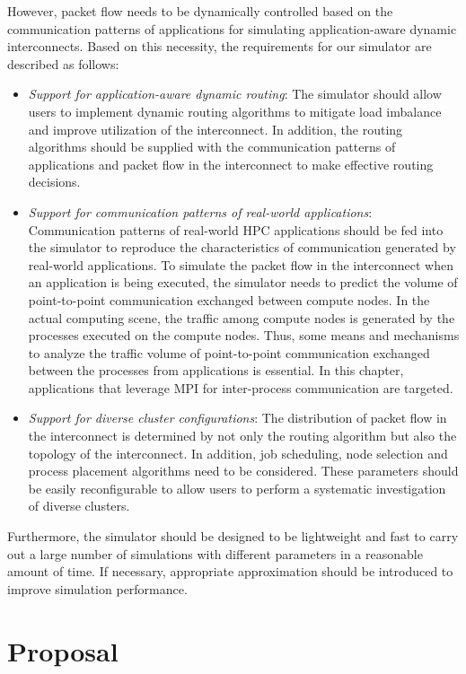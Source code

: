 However, packet flow needs to be dynamically controlled based on the
communication patterns of applications for simulating application-aware
dynamic interconnects. Based on this necessity, the requirements for our
simulator are described as follows:

\begin{itemize}
\item
  \emph{Support for application-aware dynamic routing}: The simulator
  should allow users to implement dynamic routing algorithms to mitigate
  load imbalance and improve utilization of the interconnect. In
  addition, the routing algorithms should be supplied with the
  communication patterns of applications and packet flow in the
  interconnect to make effective routing decisions.
\item
  \emph{Support for communication patterns of real-world applications}:
  Communication patterns of real-world HPC applications should be fed
  into the simulator to reproduce the characteristics of communication
  generated by real-world applications. To simulate the packet flow in
  the interconnect when an application is being executed, the simulator
  needs to predict the volume of point-to-point communication exchanged
  between compute nodes. In the actual computing scene, the traffic
  among compute nodes is generated by the processes executed on the
  compute nodes. Thus, some means and mechanisms to analyze the
  traffic volume of point-to-point communication exchanged between the
  processes from applications is essential. In this chapter, applications
  that leverage MPI for inter-process communication are targeted.
\item
  \emph{Support for diverse cluster configurations}: The distribution of
  packet flow in the interconnect is determined by not only the routing
  algorithm but also the topology of the interconnect. In addition, job
  scheduling, node selection and process placement algorithms need to be
  considered. These parameters should be easily reconfigurable to allow
  users to perform a systematic investigation of diverse clusters.
\end{itemize}

Furthermore, the simulator should be designed to be lightweight and fast
to carry out a large number of simulations with different parameters in
a reasonable amount of time. If necessary, appropriate approximation
should be introduced to improve simulation performance.

\section{Proposal}\label{sec:ii-proposal}

